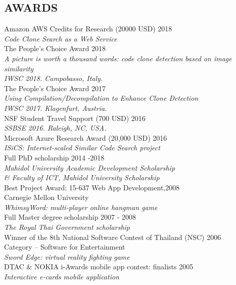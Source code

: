 \documentclass[margin, 10pt]{res} %
\begin{document}
\begin{resume}

\section{AWARDS}
Amazon AWS Credits for Research (20000 USD) \hfill 2018 \\ 
\textit{Code Clone Search as a Web Service} \vspace{2mm} \\
The People's Choice Award \hfill 2018 \\ 
\textit{A picture is worth a thousand words: code clone detection based on image similarity} \\
\textit{IWSC 2018. Campobasso, Italy.} \vspace{2mm} \\
The People's Choice Award \hfill 2017 \\ 
\textit{Using Compilation/Decompilation to Enhance Clone Detection} \\
\textit{IWSC 2017. Klagenfurt, Austria.} \vspace{2mm} \\
NSF Student Travel Support (700 USD) \hfill 2016 \\ 
\textit{SSBSE 2016. Raleigh, NC, USA.} \vspace{2mm} \\
Microsoft Azure Research Award (20,000 USD) \hfill 2016 \\ 
\textit{ISiCS: Internet-scaled Similar Code Search project} \vspace{2mm} \\
Full PhD scholarship \hfill 2014 -2018 \\
\textit{Mahidol University Academic Development Scholarship \\ 
\& Faculty of ICT, Mahidol University Scholarship} \vspace{2mm} \\
Best Project Award: 15-637 Web App Development,\hfill 2008 \\Carnegie Mellon University \\ 
\textit{WhimsyWord: multi-player online hangman game} \vspace{2mm} \\
Full Master degree scholarship \hfill 2007 - 2008 \\
\textit{The Royal Thai Government scholarship} \vspace{2mm} \\
Winner of the 8th National Software Contest of Thailand (NSC) \hfill 2006 \\ 
Category -- Software for Entertainment \\
\textit{Sword Edge: virtual reality fighting game} \vspace{2mm} \\
DTAC \& NOKIA i-Awards mobile app contest: finalists \hfill 2005  \\
\textit{Interactive e-cards mobile application}
 

\end{resume}
\end{document}
